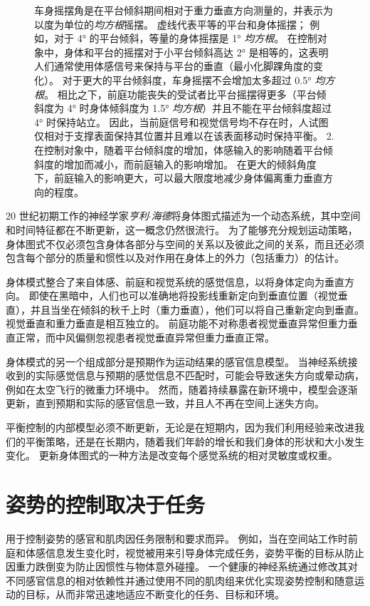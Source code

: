 \begin{figure}[htbp]
{		车身摇摆角是在平台倾斜期间相对于重力垂直方向测量的，并表示为以度为单位的\textit{均方根}摇摆。
		虚线代表平等的平台和身体摇摆；
		例如，对于 4° 的平台倾斜，等量的身体摇摆是 1° \textit{均方根}。
		在控制对象中，身体和平台的摇摆对于小平台倾斜高达 2° 是相等的，这表明人们通常使用体感信号来保持与平台的垂直（最小化脚踝角度的变化）。
		对于更大的平台倾斜度，车身摇摆不会增加太多超过 0.5° \textit{均方根}。
		相比之下，前庭功能丧失的受试者比平台摇摆得更多（平台倾斜度为 4° 时身体倾斜度为 1.5° \textit{均方根}）并且不能在平台倾斜度超过 4° 时保持站立。
		因此，当前庭信号和视觉信号均不存在时，人试图仅相对于支撑表面保持其位置并且难以在该表面移动时保持平衡。
		2. 在控制对象中，随着平台倾斜度的增加，体感输入的影响随着平台倾斜度的增加而减小，而前庭输入的影响增加。
		在更大的倾斜角度下，前庭输入的影响更大，可以最大限度地减少身体偏离重力垂直方向的程度。}
	\label{fig:36_12}
\end{figure}


20 世纪初期工作的神经学家\textit{亨利$\cdot$海德}将身体图式描述为一个动态系统，其中空间和时间特征都在不断更新，这一概念仍然很流行。
为了能够充分规划运动策略，身体图式不仅必须包含身体各部分与空间的关系以及彼此之间的关系，而且还必须包含每个部分的质量和惯性以及对作用在身体上的外力（包括重力）的估计。


身体模式整合了来自体感、前庭和视觉系统的感觉信息，以将身体定向为垂直方向。
即使在黑暗中，人们也可以准确地将投影线重新定向到垂直位置（视觉垂直），并且当坐在倾斜的秋千上时（重力垂直），他们可以将自己重新定向到垂直。
视觉垂直和重力垂直是相互独立的。
前庭功能不对称患者视觉垂直异常但重力垂直正常，而中风偏侧忽视患者视觉垂直异常但重力垂直正常。


身体模式的另一个组成部分是预期作为运动结果的感官信息模型。
当神经系统接收到的实际感觉信息与预期的感觉信息不匹配时，可能会导致迷失方向或晕动病，例如在太空飞行的微重力环境中。
然而，随着持续暴露在新环境中，模型会逐渐更新，直到预期和实际的感官信息一致，并且人不再在空间上迷失方向。


平衡控制的内部模型必须不断更新，无论是在短期内，因为我们利用经验来改进我们的平衡策略，还是在长期内，随着我们年龄的增长和我们身体的形状和大小发生变化。
更新身体图式的一种方法是改变每个感觉系统的相对灵敏度或权重。



\section{姿势的控制取决于任务}

用于控制姿势的感官和肌肉因任务限制和要求而异。
例如，当在空间站工作时前庭和体感信息发生变化时，视觉被用来引导身体完成任务，姿势平衡的目标从防止因重力跌倒变为防止因惯性与物体意外碰撞。
一个健康的神经系统通过修改其对不同感官信息的相对依赖性并通过使用不同的肌肉组来优化实现姿势控制和随意运动的目标，从而非常迅速地适应不断变化的任务、目标和环境。



